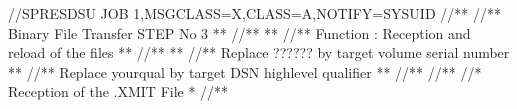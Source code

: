 \documentclass[letterpaper,10pt,english]{sphinxmanual}
\begin{document}
\begin{sphinxVerbatim}[commandchars=\\\{\}]
//SPRESDSU JOB 1,MSGCLASS=X,CLASS=A,NOTIFY=\PYGZam{}SYSUID
//*\PYGZhy{}\PYGZhy{}\PYGZhy{}\PYGZhy{}\PYGZhy{}\PYGZhy{}\PYGZhy{}\PYGZhy{}\PYGZhy{}\PYGZhy{}\PYGZhy{}\PYGZhy{}\PYGZhy{}\PYGZhy{}\PYGZhy{}\PYGZhy{}\PYGZhy{}\PYGZhy{}\PYGZhy{}\PYGZhy{}\PYGZhy{}\PYGZhy{}\PYGZhy{}\PYGZhy{}\PYGZhy{}\PYGZhy{}\PYGZhy{}\PYGZhy{}\PYGZhy{}\PYGZhy{}\PYGZhy{}\PYGZhy{}\PYGZhy{}\PYGZhy{}\PYGZhy{}\PYGZhy{}\PYGZhy{}\PYGZhy{}\PYGZhy{}\PYGZhy{}\PYGZhy{}\PYGZhy{}\PYGZhy{}\PYGZhy{}\PYGZhy{}\PYGZhy{}\PYGZhy{}\PYGZhy{}\PYGZhy{}\PYGZhy{}\PYGZhy{}\PYGZhy{}\PYGZhy{}\PYGZhy{}\PYGZhy{}\PYGZhy{}\PYGZhy{}\PYGZhy{}\PYGZhy{}\PYGZhy{}\PYGZhy{}\PYGZhy{}\PYGZhy{}\PYGZhy{}\PYGZhy{}\PYGZhy{}\PYGZhy{}*
//*\PYGZhy{}\PYGZhy{}* Binary File Transfer \PYGZhy{} STEP No 3 *\PYGZhy{}\PYGZhy{}*
//*\PYGZhy{}\PYGZhy{}* *\PYGZhy{}\PYGZhy{}*
//*\PYGZhy{}\PYGZhy{}* Function : Reception and reload of the files *\PYGZhy{}\PYGZhy{}*
//*\PYGZhy{}\PYGZhy{}* *\PYGZhy{}\PYGZhy{}*
//*\PYGZhy{}\PYGZhy{}* Replace \PYGZsq{}??????\PYGZsq{} by target volume serial number *\PYGZhy{}\PYGZhy{}*
//*\PYGZhy{}\PYGZhy{}* Replace \PYGZsq{}yourqual\PYGZsq{} by target DSN high\PYGZhy{}level qualifier
*\PYGZhy{}\PYGZhy{}*
//*\PYGZhy{}\PYGZhy{}\PYGZhy{}\PYGZhy{}\PYGZhy{}\PYGZhy{}\PYGZhy{}\PYGZhy{}\PYGZhy{}\PYGZhy{}\PYGZhy{}\PYGZhy{}\PYGZhy{}\PYGZhy{}\PYGZhy{}\PYGZhy{}\PYGZhy{}\PYGZhy{}\PYGZhy{}\PYGZhy{}\PYGZhy{}\PYGZhy{}\PYGZhy{}\PYGZhy{}\PYGZhy{}\PYGZhy{}\PYGZhy{}\PYGZhy{}\PYGZhy{}\PYGZhy{}\PYGZhy{}\PYGZhy{}\PYGZhy{}\PYGZhy{}\PYGZhy{}\PYGZhy{}\PYGZhy{}\PYGZhy{}\PYGZhy{}\PYGZhy{}\PYGZhy{}\PYGZhy{}\PYGZhy{}\PYGZhy{}\PYGZhy{}\PYGZhy{}\PYGZhy{}\PYGZhy{}\PYGZhy{}\PYGZhy{}\PYGZhy{}\PYGZhy{}\PYGZhy{}\PYGZhy{}\PYGZhy{}\PYGZhy{}\PYGZhy{}\PYGZhy{}\PYGZhy{}\PYGZhy{}\PYGZhy{}\PYGZhy{}\PYGZhy{}\PYGZhy{}\PYGZhy{}\PYGZhy{}\PYGZhy{}*
//*\PYGZhy{}\PYGZhy{}\PYGZhy{}\PYGZhy{}\PYGZhy{}\PYGZhy{}\PYGZhy{}\PYGZhy{}\PYGZhy{}\PYGZhy{}\PYGZhy{}\PYGZhy{}\PYGZhy{}\PYGZhy{}\PYGZhy{}\PYGZhy{}\PYGZhy{}\PYGZhy{}\PYGZhy{}\PYGZhy{}\PYGZhy{}\PYGZhy{}\PYGZhy{}\PYGZhy{}\PYGZhy{}\PYGZhy{}\PYGZhy{}\PYGZhy{}\PYGZhy{}\PYGZhy{}\PYGZhy{}\PYGZhy{}\PYGZhy{}\PYGZhy{}\PYGZhy{}\PYGZhy{}\PYGZhy{}\PYGZhy{}\PYGZhy{}\PYGZhy{}\PYGZhy{}\PYGZhy{}\PYGZhy{}\PYGZhy{}\PYGZhy{}\PYGZhy{}\PYGZhy{}\PYGZhy{}\PYGZhy{}\PYGZhy{}\PYGZhy{}\PYGZhy{}\PYGZhy{}\PYGZhy{}\PYGZhy{}\PYGZhy{}\PYGZhy{}\PYGZhy{}\PYGZhy{}\PYGZhy{}\PYGZhy{}\PYGZhy{}\PYGZhy{}\PYGZhy{}\PYGZhy{}\PYGZhy{}\PYGZhy{}*
//* Reception of the .XMIT File *
//*\PYGZhy{}\PYGZhy{}\PYGZhy{}\PYGZhy{}\PYGZhy{}\PYGZhy{}\PYGZhy{}\PYGZhy{}\PYGZhy{}\PYGZhy{}\PYGZhy{}\PYGZhy{}\PYGZhy{}\PYGZhy{}\PYGZhy{}\PYGZhy{}\PYGZhy{}\PYGZhy{}\PYGZhy{}\PYGZhy{}\PYGZhy{}\PYGZhy{}\PYGZhy{}\PYGZhy{}\PYGZhy{}\PYGZhy{}\PYGZhy{}\PYGZhy{}\PYGZhy{}\PYGZhy{}\PYGZhy{}\PYGZhy{}\PYGZhy{}\PYGZhy{}\PYGZhy{}\PYGZhy{}\PYGZhy{}\PYGZhy{}\PYGZhy{}\PYGZhy{}\PYGZhy{}\PYGZhy{}\PYGZhy{}\PYGZhy{}\PYGZhy{}\PYGZhy{}\PYGZhy{}\PYGZhy{}\PYGZhy{}\PYGZhy{}\PYGZhy{}\PYGZhy{}\PYGZhy{}\PYGZhy{}\PYGZhy{}\PYGZhy{}\PYGZhy{}\PYGZhy{}\PYGZhy{}\PYGZhy{}\PYGZhy{}\PYGZhy{}\PYGZhy{}\PYGZhy{}\PYGZhy{}\PYGZhy{}\PYGZhy{}*

\end{sphinxVerbatim}
\end{document}
